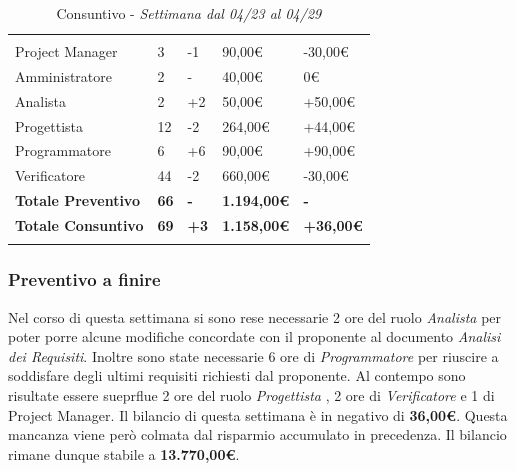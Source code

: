 \label{sec:tabellaConsuntivo1Sett}
\begin{table}[H]
	\centering
	\begin{tabular}{|p{3.8cm}|C{2.6cm}|C{2.9cm}|C{2.7cm}|C{3.3cm}|}
		
		 & & & & \\
		Project Manager & 3 & -1 & 90,00\euro & -30,00\euro \\
		\hline
		Amministratore & 2 & - & 40,00\euro & 0\euro \\
		\hline
		Analista      & 2 & +2 & 50,00\euro & +50,00\euro \\
		\hline
		Progettista   & 12 & -2 & 264,00\euro & +44,00\euro \\
		\hline
		Programmatore & 6 & +6 & 90,00\euro & +90,00\euro \\
		\hline
		Verificatore  & 44 & -2 & 660,00\euro & -30,00\euro \\
		\textbf{Totale Preventivo} & \textbf{66} & \textbf{-} & \textbf{1.194,00\euro} & \textbf{-}\\
		\textbf{Totale Consuntivo} & \textbf{69} & \textbf{+3} & \textbf{1.158,00\euro} & \textbf{+36,00\euro}\\
	\end{tabular}
	\caption{Consuntivo - \textit{Settimana dal 04/23 al 04/29}}
	
\end{table}

\subsubsection{Preventivo a finire}
Nel corso di questa settimana si sono rese necessarie 2 ore del ruolo \textit{Analista} per poter porre alcune modifiche concordate con il proponente al documento \textit{Analisi dei Requisiti}. Inoltre sono state necessarie 6 ore di \textit{Programmatore} per riuscire a soddisfare degli ultimi requisiti richiesti dal proponente. Al contempo sono risultate essere sueprflue 2 ore del ruolo \textit{Progettista} , 2 ore di \textit{Verificatore} e 1 di {Project Manager}. Il bilancio di questa settimana è in negativo di \textbf{36,00\euro}. Questa mancanza viene però colmata dal risparmio accumulato in precedenza. Il bilancio rimane dunque stabile a \textbf{13.770,00\euro}.  





